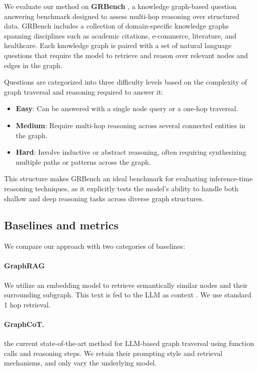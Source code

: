 We evaluate our method on \textbf{GRBench} \citep{jin2024graph}, a knowledge graph-based question answering benchmark designed to assess multi-hop reasoning over structured data. GRBench includes a collection of domain-specific knowledge graphs spanning disciplines such as academic citations, e-commerce, literature, and healthcare. Each knowledge graph is paired with a set of natural language questions that require the model to retrieve and reason over relevant nodes and edges in the graph.

Questions are categorized into three difficulty levels based on the complexity of graph traversal and reasoning required to answer it:

\begin{itemize}
    \item \textbf{Easy}: Can be answered with a single node query or a one-hop traversal.
    \item \textbf{Medium}: Require multi-hop reasoning across several connected entities in the graph.
    \item \textbf{Hard}: Involve inductive or abstract reasoning, often requiring synthesizing multiple paths or patterns across the graph.
\end{itemize}

This structure makes GRBench an ideal benchmark for evaluating inference-time reasoning techniques, as it explicitly tests the model's ability to handle both shallow and deep reasoning tasks across diverse graph structures.

\subsection{Baselines and metrics}

We compare our approach with two categories of baselines:

\paragraph{GraphRAG}
We utilize an embedding model to retrieve semantically similar nodes and their surrounding subgraph. This text is fed to the LLM as context \citep{ye2024language}. We use standard 1 hop retrieval.

\paragraph{GraphCoT.}
the current state-of-the-art method for LLM-based graph traversal using function calls and reasoning steps. We retain their prompting style and retrieval mechanisms, and only vary the underlying model.

